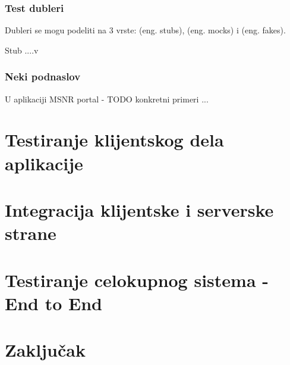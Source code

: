 \documentclass[12pt,oneside]{memoir}
\begin{document}
\subsection{Test dubleri}
Dubleri se mogu podeliti na 3 vrste:  (eng. stubs), (eng. mocks) i  (eng. fakes). 
\par Stub ....v

\subsection{Neki podnaslov}
U aplikaciji MSNR portal - TODO konkretni primeri ... 

\chapter{Testiranje klijentskog dela aplikacije}
\label{chp:elm}

\chapter{Integracija klijentske i serverske strane}
\label{chp:elmelixir}

\chapter{Testiranje celokupnog sistema - End to End}
\label{chp:e2e}

\chapter{Zaključak}

\literatura

\backmatter


\end{document}
